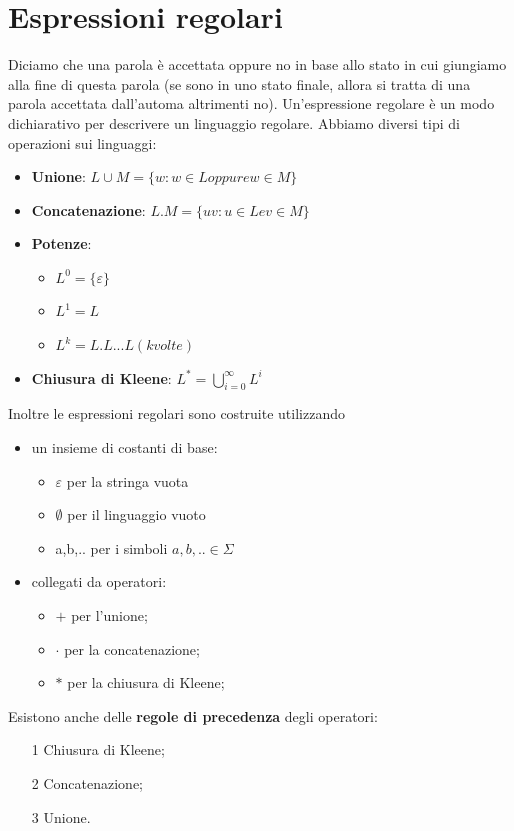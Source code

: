 \chapter{Espressioni regolari}
Diciamo che una parola è accettata oppure no in base allo stato in cui giungiamo alla
fine di questa parola (se sono in uno stato finale, allora si tratta di una parola accettata
dall'automa altrimenti no).
Un'espressione regolare è un modo dichiarativo per descrivere un linguaggio regolare.
Abbiamo diversi tipi di operazioni sui linguaggi:

\begin{itemize}
\item \textbf{Unione}: $L\cup M=\{w:w \in L oppure w \in M\}$
\item \textbf{Concatenazione}: $L.M=\{uv : u \in L e v \in M\}$
\item \textbf{Potenze}: 
	\begin{itemize}
	\item $L^{0}=\{\varepsilon\}$
	\item $L^{1}=L$   
	\item $L^{k}=L.L...L(k volte)$
	\end{itemize}
\item \textbf{Chiusura di Kleene}: $L^{\ast} = \bigcup_{i=0}^\infty L^{i}$
\end{itemize} 

Inoltre le espressioni regolari sono costruite utilizzando 

\begin{itemize}
\item un insieme di costanti di base:
	\begin{itemize}
	\item $\varepsilon$ per la stringa vuota
	\item $\emptyset$ per il linguaggio vuoto
	\item a,b,.. per i simboli $a,b,..\in \Sigma$
	\end{itemize}
\item collegati da operatori:
	\begin{itemize}
	\item $+$ per l'unione;
	\item $\cdot$ per la concatenazione;
	\item $\ast$ per la chiusura di Kleene;
	\end{itemize}
\end{itemize}

Esistono anche delle \textbf{regole di precedenza} degli operatori:
\begin{itemize}
\item[1]Chiusura di Kleene;
\item[2]Concatenazione;
\item[3]Unione.
\end{itemize}

